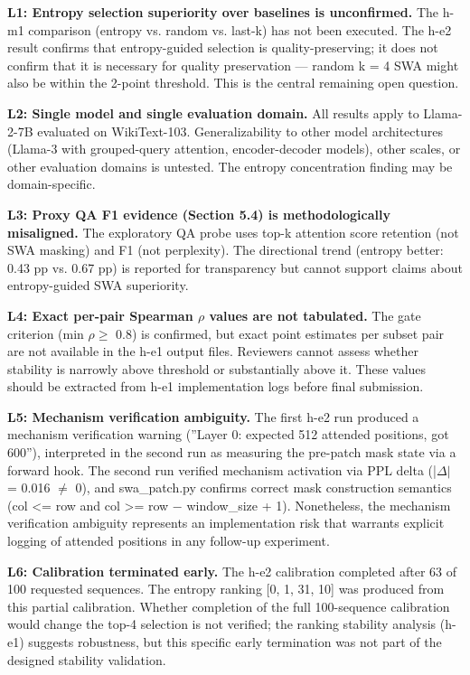 \textbf{L1: Entropy selection superiority over baselines is unconfirmed.} The h-m1 comparison (entropy vs. random vs. last-k) has not been executed. The h-e2 result confirms that entropy-guided selection is quality-preserving; it does not confirm that it is necessary for quality preservation --- random k = 4 SWA might also be within the 2-point threshold. This is the central remaining open question.

\textbf{L2: Single model and single evaluation domain.} All results apply to Llama-2-7B evaluated on WikiText-103. Generalizability to other model architectures (Llama-3 with grouped-query attention, encoder-decoder models), other scales, or other evaluation domains is untested. The entropy concentration finding may be domain-specific.

\textbf{L3: Proxy QA F1 evidence (Section 5.4) is methodologically misaligned.} The exploratory QA probe uses top-k attention score retention (not SWA masking) and F1 (not perplexity). The directional trend (entropy better: 0.43 pp vs. 0.67 pp) is reported for transparency but cannot support claims about entropy-guided SWA superiority.

\textbf{L4: Exact per-pair Spearman $\rho$ values are not tabulated.} The gate criterion (min $\rho \geq$ 0.8) is confirmed, but exact point estimates per subset pair are not available in the h-e1 output files. Reviewers cannot assess whether stability is narrowly above threshold or substantially above it. These values should be extracted from h-e1 implementation logs before final submission.

\textbf{L5: Mechanism verification ambiguity.} The first h-e2 run produced a mechanism verification warning (''Layer 0: expected 512 attended positions, got 600''), interpreted in the second run as measuring the pre-patch mask state via a forward hook. The second run verified mechanism activation via PPL delta (|$\Delta |$ = 0.016 $\neq$ 0), and swa\_patch.py confirms correct mask construction semantics (col <= row and col >= row $-$ window\_size + 1). Nonetheless, the mechanism verification ambiguity represents an implementation risk that warrants explicit logging of attended positions in any follow-up experiment.

\textbf{L6: Calibration terminated early.} The h-e2 calibration completed after 63 of 100 requested sequences. The entropy ranking [0, 1, 31, 10] was produced from this partial calibration. Whether completion of the full 100-sequence calibration would change the top-4 selection is not verified; the ranking stability analysis (h-e1) suggests robustness, but this specific early termination was not part of the designed stability validation.

